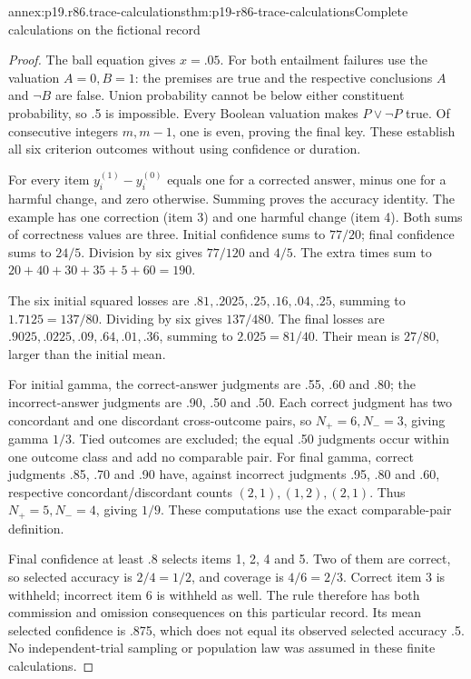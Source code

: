 \begin{annexitem}{annex:p19.r86.trace-calculations}{thm:p19-r86-trace-calculations}{Complete calculations on the fictional record}
\begin{proof}
The ball equation gives \(x=.05\). For both entailment failures use the
valuation \(A=0,B=1\): the premises are true and the respective
conclusions \(A\) and \(\neg B\) are false. Union probability cannot
be below either constituent probability, so .5 is impossible. Every Boolean
valuation makes \(P\lor\neg P\) true. Of consecutive integers
\(m,m-1\), one is even, proving the final key. These establish all six
criterion outcomes without using confidence or duration.

For every item \(y_i^{(1)}-y_i^{(0)}\) equals one for a corrected
answer, minus one for a harmful change, and zero otherwise. Summing proves
the accuracy identity. The example has one correction (item 3) and one
harmful change (item 4). Both sums of correctness values are three.
Initial confidence sums to \(77/20\); final confidence sums to
\(24/5\). Division by six gives \(77/120\) and \(4/5\).
The extra times sum to \(20+40+30+35+5+60=190\).

The six initial squared losses are
\(.81,.2025,.25,.16,.04,.25\), summing to \(1.7125=137/80\).
Dividing by six gives \(137/480\). The final losses are
\(.9025,.0225,.09,.64,.01,.36\), summing to \(2.025=81/40\).
Their mean is \(27/80\), larger than the initial mean.

For initial gamma, the correct-answer judgments are .55, .60 and .80;
the incorrect-answer judgments are .90, .50 and .50. Each correct judgment
has two concordant and one discordant cross-outcome pairs, so
\(N_+=6,N_-=3\), giving gamma \(1/3\). Tied outcomes are excluded;
the equal .50 judgments occur within one outcome class and add no comparable
pair. For final gamma, correct judgments .85, .70 and .90 have, against
incorrect judgments .95, .80 and .60, respective concordant/discordant
counts \((2,1),(1,2),(2,1)\). Thus \(N_+=5,N_-=4\), giving
\(1/9\). These computations use the exact comparable-pair definition.

Final confidence at least .8 selects items 1, 2, 4 and 5. Two of them are
correct, so selected accuracy is \(2/4=1/2\), and coverage is
\(4/6=2/3\). Correct item 3 is withheld; incorrect item 6 is withheld
as well. The rule therefore has both commission and omission consequences
on this particular record. Its mean selected confidence is .875, which does
not equal its observed selected accuracy .5. No independent-trial sampling
or population law was assumed in these finite calculations.
\end{proof}
\end{annexitem}

